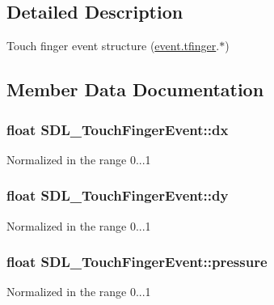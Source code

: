\subsection{Detailed Description}
Touch finger event structure (\hyperlink{unionSDL__Event_ab18d7d60794cb056948ffa58541bc3c5}{event.\+tfinger}.$\ast$) 

\subsection{Member Data Documentation}
\hypertarget{structSDL__TouchFingerEvent_ac6acac209d6e2bd659fdb6760081393d}{}
\subsubsection[{dx}]{\setlength{\rightskip}{0pt plus 5cm}float S\+D\+L\+\_\+\+Touch\+Finger\+Event\+::dx}\label{structSDL__TouchFingerEvent_ac6acac209d6e2bd659fdb6760081393d}
Normalized in the range 0...1 \hypertarget{structSDL__TouchFingerEvent_a9c0320c5f18a6b9d10da657e166608c9}{}
\subsubsection[{dy}]{\setlength{\rightskip}{0pt plus 5cm}float S\+D\+L\+\_\+\+Touch\+Finger\+Event\+::dy}\label{structSDL__TouchFingerEvent_a9c0320c5f18a6b9d10da657e166608c9}
Normalized in the range 0...1 \hypertarget{structSDL__TouchFingerEvent_ab4fca822d0807b5748dbae8d3cc56524}{}
\subsubsection[{pressure}]{\setlength{\rightskip}{0pt plus 5cm}float S\+D\+L\+\_\+\+Touch\+Finger\+Event\+::pressure}\label{structSDL__TouchFingerEvent_ab4fca822d0807b5748dbae8d3cc56524}
Normalized in the range 0...1 \hypertarget{structSDL__TouchFingerEvent_ad7a6f39ec9af1bf47b160d18314edd70}{}
